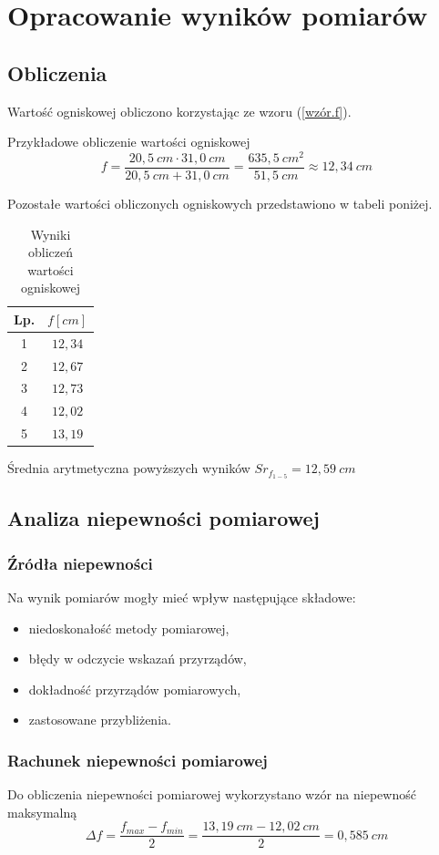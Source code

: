 \documentclass[11pt,oneside,final,notitlepage,a4paper,wide]{mwart}
\begin{document}
\section{Opracowanie wyników pomiarów}
	\subsection{Obliczenia}
		Wartość ogniskowej obliczono korzystając ze wzoru (\ref{wzór.f}).
		
		Przykładowe obliczenie wartości ogniskowej
		\begin{equation}
			f = \frac{20,5 \ cm \cdot 31,0 \ cm}{20,5 \ cm + 31,0 \ cm} = \frac{635,5 \ cm^{2}}{51,5 \ cm} \approx 12,34 \ cm 
		\end{equation}
		
		Pozostałe wartości obliczonych ogniskowych przedstawiono w tabeli poniżej.
		\begin{table}[h]
			\centering
			\begin{tabular}{c|c}
				Lp. & $f \left[ cm \right]$ \\ \hline
				1 & $12,34$ \\
				2 & $12,67$ \\
				3 & $12,73$ \\
				4 & $12,02$ \\
				5 & $13,19$ \\
			\end{tabular}
			\caption{Wyniki obliczeń wartości ogniskowej}
		\end{table}
		
		Średnia arytmetyczna powyższych wyników $Sr_{f_{1-5}} = 12,59 \ cm$
%
	\subsection{Analiza niepewności pomiarowej}
		\subsubsection{Źródła niepewności}
			Na wynik pomiarów mogły mieć wpływ następujące składowe:
			\begin{itemize}
				\item niedoskonałość metody pomiarowej,
				\item błędy w odczycie wskazań przyrządów,
				\item dokładność przyrządów pomiarowych,
				\item zastosowane przybliżenia.
			\end{itemize}
		\subsubsection{Rachunek niepewności pomiarowej}
			Do obliczenia niepewności pomiarowej wykorzystano wzór na niepewność maksymalną
			\begin{equation}
				\Delta f = \frac{f_{max} - f_{min}}{2} = \frac{13,19 \ cm - 12,02 \ cm}{2} = 0,585 \ cm
			\end{equation}
%
\end{document}
